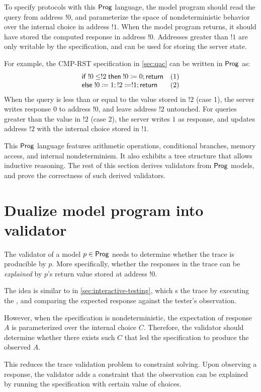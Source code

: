 To specify protocols with this $\mathsf{Prog}$ language, the model program should read
the query from address $!0$, and parameterize the space of nondeterministic
behavior over the internal choice in address $!1$.  When the model program
returns, it should have stored the computed response in address $!0$.  Addresses
greater than $!1$ are only writable by the specification, and can be used for
storing the server state.

For example, the CMP-RST specification in \autoref{sec:qac} can be written in
$\mathsf{Prog}$ as:
\[\begin{array}{ll}
\mathsf{if}\; !0\le!2\;\mathsf{then}\; !0\coloneqq0;\mathsf{return}&(1)\\
\mathsf{else}\;!0\coloneqq1;!2\coloneqq!1;\mathsf{return}&(2)
\end{array}\]
When the query is less than or equal to the value stored in $!2$ (case 1), the
server writes response $0$ to address $!0$, and leave address $!2$ untouched.
For queries greater than the value in $!2$ (case 2), the server writes $1$ as
response, and updates address $!2$ with the internal choice stored in $!1$.

This $\mathsf{Prog}$ language features arithmetic operations, conditional branches,
memory access, and internal nondeterminism.  It also exhibits a tree structure
that allows inductive reasoning.  The rest of this section derives validators
from $\mathsf{Prog}$ models, and prove the correctness of such derived validators.

\section{Dualize model program into validator}
\label{sec:dualize-prog}
The validator of a model $p\in\mathsf{Prog}$ needs to determine whether the trace is
producible by $p$.  More specifically, whether the responses in the trace can be
{\em explained} by $p$'s return value stored at address $!0$.

The idea is similar to  in \autoref{sec:interactive-testing}, which
s the trace by executing the , and comparing the
expected response against the tester's observation.

However, when the specification is nondeterministic, the expectation of response
$A$ is parameterized over the internal choice $C$.  Therefore, the validator
should determine whether there exists such $C$ that led the specification to
produce the observed $A$.

This reduces the trace validation problem to constraint solving.  Upon observing
a response, the validator adds a constraint that the observation can be
explained by running the specification with certain value of choices.

